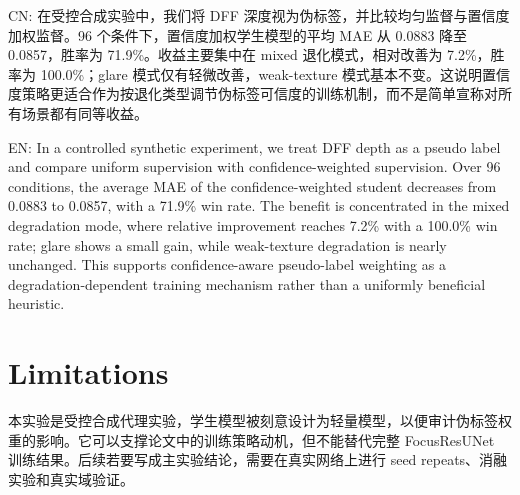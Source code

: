 \documentclass[11pt]{article}
\begin{document}
CN: 在受控合成实验中，我们将 DFF 深度视为伪标签，并比较均匀监督与置信度加权监督。96 个条件下，置信度加权学生模型的平均 MAE 从 0.0883 降至 0.0857，胜率为 71.9\%。收益主要集中在 mixed 退化模式，相对改善为 7.2\%，胜率为 100.0\%；glare 模式仅有轻微改善，weak-texture 模式基本不变。这说明置信度策略更适合作为按退化类型调节伪标签可信度的训练机制，而不是简单宣称对所有场景都有同等收益。

EN: In a controlled synthetic experiment, we treat DFF depth as a pseudo label and compare uniform supervision with confidence-weighted supervision. Over 96 conditions, the average MAE of the confidence-weighted student decreases from 0.0883 to 0.0857, with a 71.9\% win rate. The benefit is concentrated in the mixed degradation mode, where relative improvement reaches 7.2\% with a 100.0\% win rate; glare shows a small gain, while weak-texture degradation is nearly unchanged. This supports confidence-aware pseudo-label weighting as a degradation-dependent training mechanism rather than a uniformly beneficial heuristic.

\section{Limitations}

本实验是受控合成代理实验，学生模型被刻意设计为轻量模型，以便审计伪标签权重的影响。它可以支撑论文中的训练策略动机，但不能替代完整 FocusResUNet 训练结果。后续若要写成主实验结论，需要在真实网络上进行 seed repeats、消融实验和真实域验证。
\end{document}
